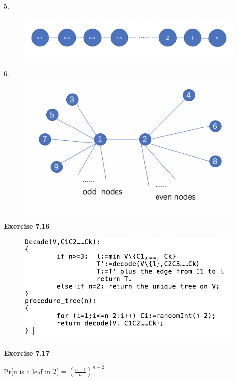 \documentclass{article} %
\begin{document}
	5.\par
  	\begin{figure}[H]
  	\centering
  	\includegraphics[scale=0.6]{7155.png}
  	\caption{}
  	\label{}
  	\end{figure}
	6.\par
  	\begin{figure}[H]
  	\centering
  	\includegraphics[scale=0.6]{7156.png}
  	\caption{}
  	\label{}
  	\end{figure}
	\textbf{Exercise 7.16}\par
  	\begin{figure}[H]
  	\centering
  	\includegraphics[scale=0.8]{7161.png}
  	\caption{}
  	\label{}
  	\end{figure}
	\textbf{Exercise 7.17}\par
	Pr$[$u is a leaf in $T]=(\frac{n-1}{n})^{n-2}$\par
\end{document}
